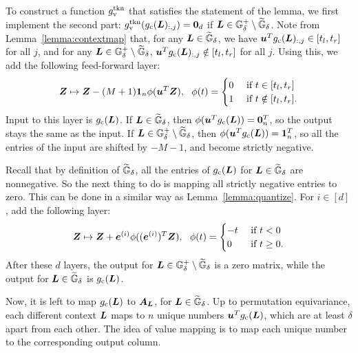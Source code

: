 To construct a function $g_{\rm v}^{\rm tkn}$ that satisfies the statement of the lemma, we first implement the second part: $g_{\rm v}^{\rm tkn}(g_{\rm c}({\bm{L}})_{:,j}) = {\bm{0}}_d$ if ${\bm{L}} \in {\mathbb{G}}^+_{\delta} \setminus \widetilde{{\mathbb{G}}}_{\delta}$.
Note from Lemma~\ref{lemma:contextmap} that, for any ${\bm{L}} \in \widetilde{{\mathbb{G}}}_{\delta}$, we have ${\bm{u}}^T g_{\rm c}({\bm{L}})_{:,j} \in [t_l, t_r]$ for all $j$, and for any ${\bm{L}} \in {\mathbb{G}}^+_{\delta} \setminus \widetilde{{\mathbb{G}}}_{\delta}$, ${\bm{u}}^T g_{\rm c}({\bm{L}})_{:,j} \notin [t_l, t_r]$ for all $j$.
Using this, we add the following feed-forward layer:
\begin{equation*}
    {\bm{Z}} \mapsto {\bm{Z}} - (M+1) {\bm{1}}_n \phi ({\bm{u}}^T {\bm{Z}}),
    ~~
    \phi(t)
    =
    \begin{cases}
        0 & \text{ if } t \in [t_l, t_r]\\
        1 & \text{ if } t \notin [t_l, t_r].
    \end{cases}
\end{equation*}
Input to this layer is $g_{\rm c}({\bm{L}})$. If ${\bm{L}} \in \widetilde{{\mathbb{G}}}_{\delta}$, then $\phi({\bm{u}}^T g_{\rm c}({\bm{L}})) = {\bm{0}}_n^T$, so the output stays the same as the input.
If ${\bm{L}} \in {\mathbb{G}}^+_{\delta} \setminus \widetilde{{\mathbb{G}}}_{\delta}$, then $\phi({\bm{u}}^T g_{\rm c}({\bm{L}})) = {\bm{1}}_n^T$, so all the entries of the input are shifted by $-M-1$, and become strictly negative.

Recall that by definition of $\widetilde{{\mathbb{G}}}_{\delta}$, all the entries of $g_{\rm c}({\bm{L}})$ for ${\bm{L}} \in \widetilde{{\mathbb{G}}}_{\delta}$ are nonnegative. So the next thing to do is mapping all strictly negative entries to zero.
This can be done in a similar way as Lemma~\ref{lemma:quantize}.
For $i \in [d]$, add the following layer:
\begin{equation*}
    {\bm{Z}} \mapsto {\bm{Z}} + {\bm{e}}^{(i)} \phi (({\bm{e}}^{(i)})^T {\bm{Z}}),
    ~~
    \phi(t)
    =
    \begin{cases}
        -t & \text{ if } t < 0\\
        0 & \text{ if } t \geq 0.
    \end{cases}
\end{equation*}
After these $d$ layers, the output for ${\bm{L}} \in {\mathbb{G}}^+_{\delta} \setminus \widetilde{{\mathbb{G}}}_{\delta}$ is a zero matrix, while the output for ${\bm{L}} \in \widetilde{{\mathbb{G}}}_{\delta}$ is $g_{\rm c}({\bm{L}})$.

Now, it is left to map $g_{\rm c}({\bm{L}})$ to ${\bm{A}}_{\bm{L}}$, for ${\bm{L}} \in \widetilde{{\mathbb{G}}}_{\delta}$. Up to permutation equivariance, each different context ${\bm{L}}$ maps to $n$ unique numbers ${\bm{u}}^T g_{\rm c}({\bm{L}})$, which are at least $\delta$ apart from each other. The idea of value mapping is to map each unique number to the corresponding output column.

